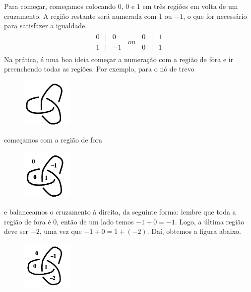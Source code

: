 	\par\vspace{0.3cm} Para começar, começamos colocando $0$, $0$ e $1$ em três regiões 
	em volta de um cruzamento. A região restante será numerada com $1$ ou $-1$, o que for 
	necessário para satisfazer a igualdade.
	\begin{align*}
    	\begin{array}{ccc}
    	0 & \vert & 0 \\
    	\hline 
    	1 & \vert & -1
    	\end{array} \ \text{ ou } \ 
    	\begin{array}{ccc}
    	0 & \vert & 1 \\
    	\hline 
    	0 & \vert & 1
    	\end{array}
	\end{align*} 
	Na prática, é uma boa ideia começar a numeração com a região de fora e ir preenchendo 
	todas as regiões. Por exemplo, para o nó de trevo
	\begin{figure}[H]
	\label{no de trevo negativo}
		\begin{center}
			\includegraphics[width=2.5cm]{Images/no_de_trevo_negativo.png}
		\end{center}
	\end{figure}
	começamos com a região de fora
	\begin{figure}[H]
	\label{no de trevo preenchendo}
		\begin{center}
			\includegraphics[width=2.5cm]{Images/no_de_trevo_preenchendo.png}
		\end{center}
	\end{figure}
	e balanceamos o cruzamento à direita, da seguinte forma: lembre que toda a região 
	de fora é $0$, então de um lado temos $-1+0=-1$. Logo, a última região deve ser $-2$,
	uma vez que $-1+0=1+(-2)$. Daí, obtemos a figura abaixo.
	\begin{figure}[H]
	\label{no de trevo preenchido}
		\begin{center}
			\includegraphics[width=2.5cm]{Images/no_de_trevo_preenchido.png}
		\end{center}
	\end{figure}
